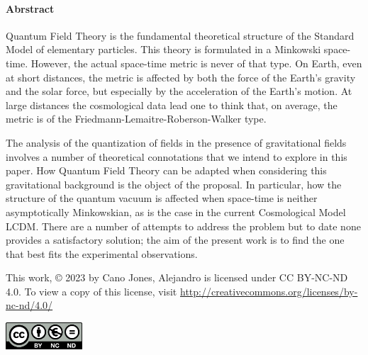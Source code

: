 \vspace*{1.0cm}
	\paragraph{Abrstract\\}
	\begin{minipage}{12cm}
		
	\vspace*{0.5cm}
	
	Quantum Field Theory is the fundamental theoretical structure of the Standard Model of elementary particles. This theory is formulated in a Minkowski space-time. However, the actual space-time metric is never of that type. On Earth, even at short distances, the metric is affected by both the force of the Earth's gravity and the solar force, but especially by the acceleration of the Earth's motion. At large distances the cosmological data lead one to think that, on average, the metric is of the Friedmann-Lemaitre-Roberson-Walker type.
	
	\vspace*{0.2cm}
	
	The analysis of the quantization of fields in the presence of gravitational fields involves a number of theoretical connotations that we intend to explore in this paper. How Quantum Field Theory can be adapted when considering this gravitational background is the object of the proposal. In particular, how the structure of the quantum vacuum is affected when space-time is neither asymptotically Minkowskian, as is the case in the current Cosmological Model LCDM. There are a number of attempts to address the problem but to date none provides a satisfactory solution; the aim of the present work is to find the one that best fits the experimental observations.
	
	\end{minipage}
	
	\vspace*{\fill}
	
	
	This work, © 2023 by Cano Jones, Alejandro is licensed under CC BY-NC-ND 4.0. To view a copy of this license, visit \href{http://creativecommons.org/licenses/by-nc-nd/4.0/}{http://creativecommons.org/licenses/by-nc-nd/4.0/}
	
	
	\begin{flushright}
		\includegraphics[height=1cm]{Images/Logos/by-nc-nd.eu}
	\end{flushright}
